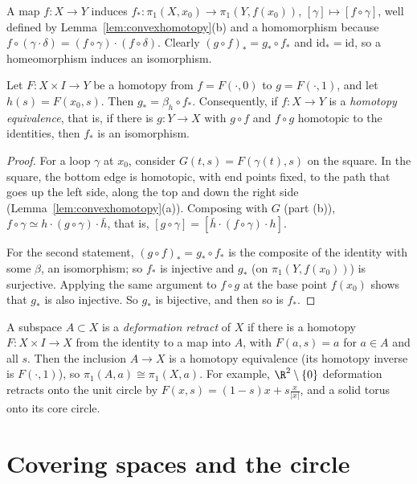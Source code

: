 A map $f\colon X\to Y$ induces $f_*\colon\pi_1(X,x_0)\to\pi_1(Y,f(x_0))$, $[\gamma]\mapsto[f\circ\gamma]$, well defined by Lemma~\ref{lem:convexhomotopy}(b) and a homomorphism because
$f\circ(\gamma\cdot\delta)=(f\circ\gamma)\cdot(f\circ\delta)$. Clearly $(g\circ f)_*=g_*\circ f_*$ and $\mathrm{id}_*=\mathrm{id}$, so a homeomorphism induces an isomorphism.

\begin{proposition}\label{prop:homotopyinv}
Let $F\colon X\times I\to Y$ be a homotopy from $f=F(\cdot,0)$ to $g=F(\cdot,1)$, and let $h(s)=F(x_0,s)$. Then $g_*=\beta_h\circ f_*$. Consequently, if $f\colon X\to Y$ is a
\emph{homotopy equivalence}, that is, if there is $g\colon Y\to X$ with $g\circ f$ and $f\circ g$ homotopic to the identities, then $f_*$ is an isomorphism.
\end{proposition}

\begin{proof}
For a loop $\gamma$ at $x_0$, consider $G(t,s)=F(\gamma(t),s)$ on the square. In the square, the bottom edge is homotopic, with end points fixed, to the path that goes up the left side,
along the top and down the right side (Lemma~\ref{lem:convexhomotopy}(a)). Composing with $G$ (part (b)), $f\circ\gamma\simeq h\cdot(g\circ\gamma)\cdot\bar h$, that is,
$[g\circ\gamma]=[\bar h\cdot(f\circ\gamma)\cdot h]$.

For the second statement, $(g\circ f)_*=g_*\circ f_*$ is the composite of the identity with some $\beta$, an isomorphism; so $f_*$ is injective and $g_*$ (on $\pi_1(Y,f(x_0))$) is
surjective. Applying the same argument to $f\circ g$ at the base point $f(x_0)$ shows that $g_*$ is also injective. So $g_*$ is bijective, and then so is $f_*$.
\end{proof}

A subspace $A\subset X$ is a \emph{deformation retract} of $X$ if there is a homotopy $F\colon X\times I\to X$ from the identity to a map into $A$, with $F(a,s)=a$ for $a\in A$ and all $s$.
Then the inclusion $A\to X$ is a homotopy equivalence (its homotopy inverse is $F(\cdot,1)$), so $\pi_1(A,a)\cong\pi_1(X,a)$. For example, $\R^2\setminus\{0\}$ deformation retracts onto the
unit circle by $F(x,s)=(1-s)x+s\frac x{|x|}$, and a solid torus onto its core circle.

\section{Covering spaces and the circle}

